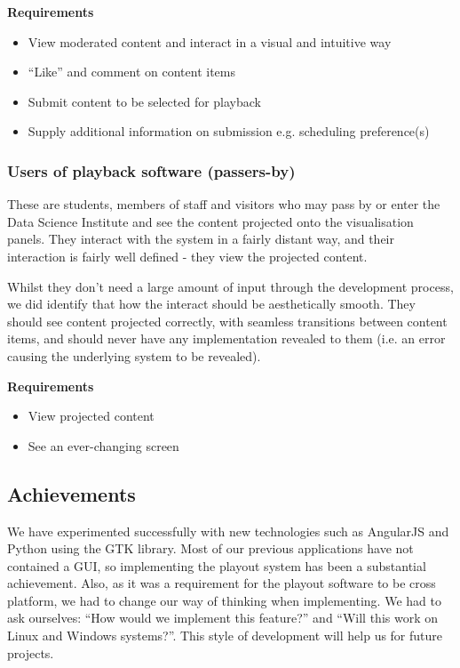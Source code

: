 \documentclass[a4paper, titlepage]{article}
\begin{document}
\textbf{Requirements}
\begin{itemize}
\itemsep-1mm
\item View moderated content and interact in a visual and intuitive way
\item ``Like'' and comment on content items
\item Submit content to be selected for playback
\item Supply additional information on submission e.g. scheduling preference(s)
\end{itemize}

\subsubsection{Users of playback software (passers-by)}

These are students, members of staff and visitors who may pass by or enter the Data Science Institute and see the content projected onto the visualisation panels. They interact with the system in a fairly distant way, and their interaction is fairly well defined - they view the projected content.

Whilst they don't need a large amount of input through the development process, we did identify that how the interact should be aesthetically smooth. They should see content projected correctly, with seamless transitions between content items, and should never have any implementation revealed to them (i.e. an error causing the underlying system to be revealed).

\textbf{Requirements}
\begin{itemize}
\itemsep-1mm
\item View projected content
\item See an ever-changing screen
\end{itemize}


\subsection{Achievements}
We have experimented successfully with new technologies such as AngularJS and Python using the GTK 
library. Most of our previous applications have not contained a GUI, so implementing the playout
system has been a substantial achievement. Also, as it was a requirement for the playout software 
to be cross platform, we had to change our way of thinking when implementing. We had to ask ourselves:
``How would we implement this feature?'' and ``Will this work on Linux and Windows systems?''. This 
style of development will help us for future projects.
\end{document}
